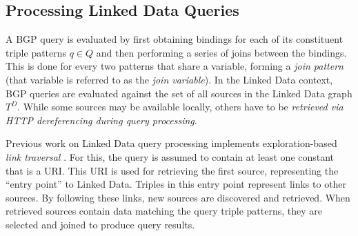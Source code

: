 
\subsection{Processing Linked Data Queries} 

A BGP query is evaluated by first obtaining bindings for each of its
constituent triple patterns $q \in Q$ and then performing a series of
joins between the bindings. This is done for every two patterns that
share a variable, forming a \emph{join pattern} (that variable is
referred to as the \emph{join variable}).
In the Linked Data context, BGP queries are 
evaluated against the set of all sources in the Linked Data graph $T^D$. 
While some sources may be available locally, others have
to be \emph{retrieved via HTTP dereferencing during query processing}. 

Previous work on Linked Data query processing
implements exploration-based \emph{link traversal} 
\cite{hartig_executing_2009,hartig_zero_2011}. 
For this, the query is assumed to contain at least one constant that
is a URI. This URI is used for retrieving the first source,
representing the ``entry point'' to Linked Data. Triples in this entry
point represent links to other sources. By following these links, new
sources are discovered and retrieved. When retrieved sources contain
data matching the query triple patterns, they are selected and joined
to produce query results.

